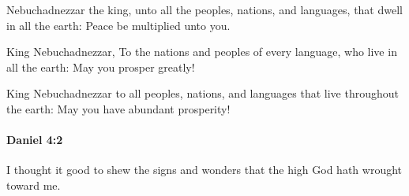 			\begin{versebox}
					\item[BHS] 
					\item[LXX] 
					\item[ASV] Nebuchadnezzar the king, unto all the peoples, nations, and languages, that dwell in all the earth: Peace be multiplied unto you.
					\item[NIV] King Nebuchadnezzar, To the nations and peoples of every language, who live in all the earth: May you prosper greatly!
					\item[NRSV] King Nebuchadnezzar to all peoples, nations, and languages that live throughout the earth: May you have abundant prosperity!
			\end{versebox}

		\paragraph{Daniel 4:2} %
			\label{DANIEL-4-2}

			I thought it good to shew the signs and wonders that the high God hath wrought toward me.

